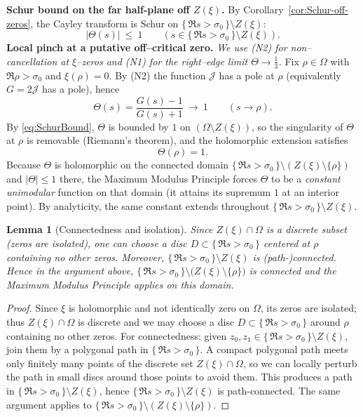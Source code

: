 \documentclass[11pt]{article}
\newtheorem{lemma}[theorem]{Lemma}
\theoremstyle{definition}
\theoremstyle{remark}
\theoremstyle{definition}
\begin{document}
\medskip
\noindent\textbf{Schur bound on the far half-plane off \(Z(\xi)\).}
By Corollary~\ref{cor:Schur-off-zeros}, the Cayley transform is Schur on $\{\,\Re s>\sigma_0\,\}\setminus Z(\xi)$:
\[
|\Theta(s)|\ \le\ 1\qquad(s\in \{\,\Re s>\sigma_0\,\}\setminus Z(\xi)).
\tag{Schur}
\label{eq:SchurBound}
\]
\medskip
\noindent\textbf{Local pinch at a putative off--critical zero.}
\emph{We use (N2) for non--cancellation at $\xi$--zeros and (N1) for the right--edge limit $\Theta\to\tfrac13$.}
Fix $\rho\in\Omega$ with $\Re\rho>\sigma_0$ and $\xi(\rho)=0$.
By (N2) the function $\mathcal J$ has a pole at $\rho$ (equivalently $G=2\mathcal J$ has a pole), hence
\[
\Theta(s)=\frac{G(s)-1}{G(s)+1}\ \longrightarrow\ 1\qquad(s\to\rho).
\]
By \eqref{eq:SchurBound}, $\Theta$ is bounded by $1$ on $(\Omega\setminus Z(\xi))$,
so the singularity of $\Theta$ at $\rho$ is removable (Riemann's theorem), and the holomorphic extension satisfies
\[
\Theta(\rho)=1.
\]
Because $\Theta$ is holomorphic on the connected domain $\{\,\Re s>\sigma_0\,\}\setminus(Z(\xi)\setminus\{\rho\})$
and $|\Theta|\le1$ there, the Maximum Modulus Principle forces $\Theta$ to be
a \emph{constant unimodular} function on that domain (it attains its supremum $1$ at an interior point).
By analyticity, the same constant extends throughout $\{\,\Re s>\sigma_0\,\}\setminus Z(\xi)$.
\medskip
\begin{lemma}[Connectedness and isolation]\label{rem:connectedness}
Since $Z(\xi)\cap\Omega$ is a discrete subset (zeros are isolated), one can choose a disc $D\subset\{\,\Re s>\sigma_0\,\}$ centered at $\rho$ containing no other zeros. Moreover, $\{\,\Re s>\sigma_0\,\}\setminus Z(\xi)$ is (path-)connected. Hence in the argument above, $\{\,\Re s>\sigma_0\,\}\setminus\big(Z(\xi)\setminus\{\rho\}\big)$ is connected and the Maximum Modulus Principle applies on this domain.
\end{lemma}
\begin{proof}
Since $\xi$ is holomorphic and not identically zero on $\Omega$, its zeros are isolated; thus $Z(\xi)\cap\Omega$ is discrete and we may choose a disc $D\subset\{\,\Re s>\sigma_0\,\}$ around $\rho$ containing no other zeros.
For connectedness: given $z_0,z_1\in \{\,\Re s>\sigma_0\,\}\setminus Z(\xi)$, join them by a polygonal path in $\{\,\Re s>\sigma_0\,\}$. A compact polygonal path meets only finitely many points of the discrete set $Z(\xi)\cap\Omega$, so we can locally perturb the path in small discs around those points to avoid them. This produces a path in $\{\,\Re s>\sigma_0\,\}\setminus Z(\xi)$, hence $\{\,\Re s>\sigma_0\,\}\setminus Z(\xi)$ is path-connected. The same argument applies to $\{\,\Re s>\sigma_0\,\}\setminus(Z(\xi)\setminus\{\rho\})$.
\end{proof}
\end{document}
